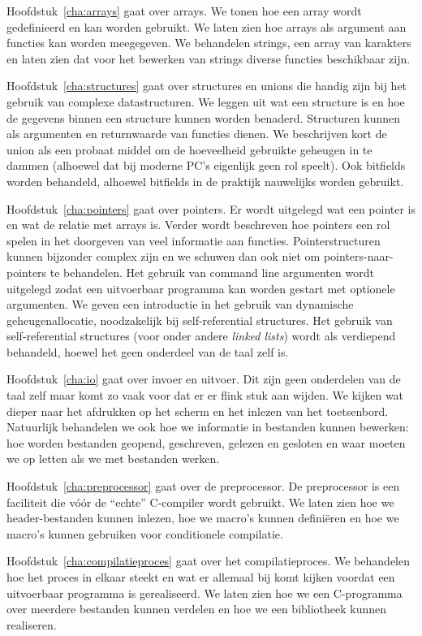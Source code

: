 Hoofdstuk~\ref{cha:arrays} gaat over arrays. We tonen hoe een array wordt gedefinieerd en kan worden gebruikt. We laten zien hoe arrays als argument aan functies kan worden meegegeven. We behandelen strings, een array van karakters en laten zien dat voor het bewerken van strings diverse functies beschikbaar zijn.

Hoofdstuk~\ref{cha:structures} gaat over structures en unions die handig zijn bij het gebruik van complexe datastructuren. We leggen uit wat een structure is en hoe de gegevens binnen een structure kunnen worden benaderd. Structuren kunnen als argumenten en returnwaarde van functies dienen. We beschrijven kort de union als een probaat middel om de hoeveelheid gebruikte geheugen in te dammen (alhoewel dat bij moderne PC's eigenlijk geen rol speelt). Ook bitfields worden behandeld, alhoewel bitfields in de praktijk nauwelijks worden gebruikt.

Hoofdstuk~\ref{cha:pointers} gaat over pointers. Er wordt uitgelegd wat een pointer is en wat de relatie met arrays is. Verder wordt beschreven hoe pointers een rol spelen in het doorgeven van veel informatie aan functies. Pointerstructuren kunnen bijzonder complex zijn en we schuwen dan ook niet om pointers-naar-pointers te behandelen. Het gebruik van command line argumenten wordt uitgelegd zodat een uitvoerbaar programma kan worden gestart met optionele argumenten. We geven een introductie in het gebruik van dynamische geheugenallocatie, noodzakelijk bij self-referential structures. Het gebruik van self-referential structures (voor onder andere \textsl{linked lists}) wordt als verdiepend behandeld, hoewel het geen onderdeel van de taal zelf is.
 
Hoofdstuk~\ref{cha:io} gaat over invoer en uitvoer. Dit zijn geen onderdelen van de taal zelf maar komt zo vaak voor dat er er flink stuk aan wijden. We kijken wat dieper naar het afdrukken op het scherm en het inlezen van het toetsenbord. Natuurlijk behandelen we ook hoe we informatie in bestanden kunnen bewerken: hoe worden bestanden geopend, geschreven, gelezen en gesloten en waar moeten we op letten als we met bestanden werken.

Hoofdstuk~\ref{cha:preprocessor} gaat over de preprocessor. De preprocessor is een faciliteit die vóór de ``echte'' C-compiler wordt gebruikt. We laten zien hoe we header-bestanden kunnen inlezen, hoe we macro's kunnen definiëren en hoe we macro's kunnen gebruiken voor conditionele compilatie.

Hoofdstuk~\ref{cha:compilatieproces} gaat over het compilatieproces. We behandelen hoe het proces in elkaar steekt en wat er allemaal bij komt kijken voordat een uitvoerbaar programma is gerealiseerd. We laten zien hoe we een C-programma over meerdere bestanden kunnen verdelen en hoe we een bibliotheek kunnen realiseren.

